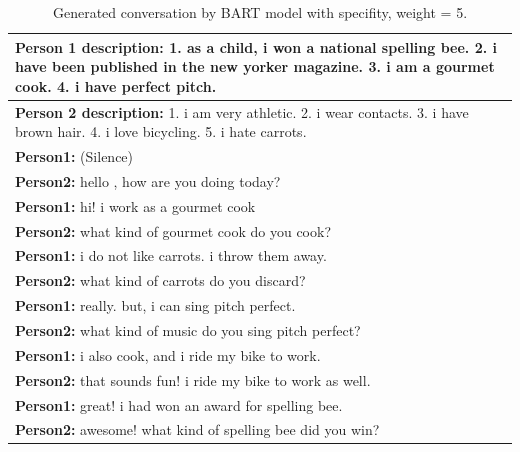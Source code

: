 \begin{table}[H]
 \begin{tabular}{|p{14cm}|}
 \hline
 \textbf{Person 1 description:} 1. as a child, i won a national spelling bee. 2. i have been published in the new yorker magazine. 3. i am a gourmet cook. 4. i have perfect pitch. \\
 \hline
 \textbf{Person 2 description:} 1. i am very athletic. 2. i wear contacts. 3. i have brown hair. 4. i love bicycling. 5. i hate carrots. \\
 \hline
 \textbf{Person1:} (Silence) \\
 \textbf{Person2:} hello , how are you doing today? \\ 
 \textbf{Person1:} hi! i work as a gourmet cook \\
 \textbf{Person2:} what kind of gourmet cook do you cook?\\
 \textbf{Person1:} i do not like carrots. i throw them away.\\
 \textbf{Person2:} what kind of carrots do you discard? \\
 \textbf{Person1:} really. but, i can sing pitch perfect.\\
 \textbf{Person2:} what kind of music do you sing pitch perfect?\\
 \textbf{Person1:} i also cook, and i ride my bike to work.\\
 \textbf{Person2:} that sounds fun! i ride my bike to work as well. \\
 \textbf{Person1:} great! i had won an award for spelling bee. \\
 \textbf{Person2:} awesome! what kind of spelling bee did you win?\\
 \hline
 \end{tabular}
\caption{Generated conversation by BART model with specifity, weight = 5.}
\label{tab:bart_nidf}
\end{table}

